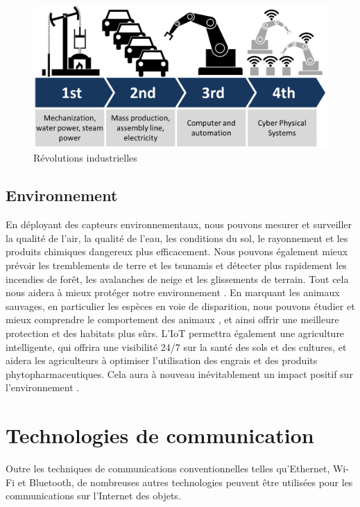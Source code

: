 \begin{figure}[H]
\centering
\includegraphics[scale=0.3]{chap1/fig3.png}
\caption{Révolutions industrielles \cite{wan2015industrie}}
\label{fig3}
\end{figure}
\subsection{Environnement}
En déployant des capteurs environnementaux, nous pouvons mesurer et surveiller la qualité de l'air, la qualité de l'eau, les conditions du sol, le rayonnement et les produits chimiques dangereux plus efficacement. Nous pouvons également mieux prévoir les tremblements de terre et les tsunamis et détecter plus rapidement les incendies de forêt, les avalanches de neige et les glissements de terrain. Tout cela nous aidera à mieux protéger notre environnement \cite{cheng2012establishing}. En marquant les animaux sauvages, en particulier les espèces en voie de disparition, nous pouvons étudier et mieux comprendre le comportement des animaux \cite{memon2016internet,nobrega2018animal}, et ainsi offrir une meilleure protection et des habitats plus sûrs. L'IoT permettra également une agriculture intelligente, qui offrira une visibilité 24/7 sur la santé des sols et des cultures, et aidera les agriculteurs à optimiser l'utilisation des engrais et des produits phytopharmaceutiques. Cela aura à nouveau inévitablement un impact positif sur l'environnement \cite{muangprathub2019iot}.
\section{Technologies de communication}
Outre les techniques de communications conventionnelles telles qu’Ethernet, Wi-Fi et Bluetooth, de nombreuses autres technologies peuvent être utilisées pour les communications sur l'Internet des objets.
